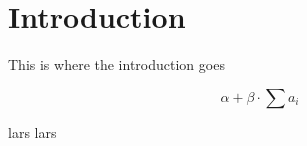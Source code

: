 \section{Introduction}

This is where the introduction goes


\begin{equation}
    \alpha + \beta \cdot \sum a_i
\end{equation}

lars lars
